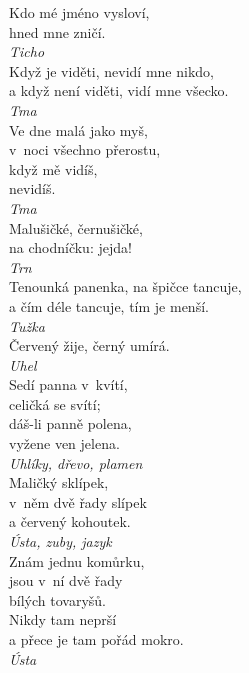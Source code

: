 \begin{multicols}{3}
\noindent
Kdo mé jméno vysloví,\\
hned mne zničí.\\[1 mm]
{\sl Ticho}\\

\noindent
Když je viděti, nevidí mne nikdo,\\
a když není viděti, vidí mne všecko.\\[1 mm]
{\sl Tma}\\

\noindent
Ve dne malá jako myš,\\
v~noci všechno přerostu,\\
když mě vidíš,\\
nevidíš.\\[1 mm]
{\sl Tma}\\

\noindent
Malušičké, černušičké,\\
na chodníčku: jejda!\\[1 mm]
{\sl Trn}\\

\noindent
Tenounká panenka, na špičce tancuje,\\
a čím déle tancuje, tím je menší.\\[1 mm]
{\sl Tužka}\\

\noindent
Červený žije, černý umírá.\\[1 mm]
{\sl Uhel}\\

\noindent
Sedí panna v~kvítí,\\
celičká se svítí;\\
dáš-li panně polena,\\
vyžene ven jelena.\\[1 mm]
{\sl Uhlíky, dřevo, plamen}\\

\noindent
Maličký sklípek,\\
v~něm dvě řady slípek\\
a červený kohoutek.\\[1 mm]
{\sl Ústa, zuby, jazyk}\\

\noindent
Znám jednu komůrku,\\
jsou v~ní dvě řady\\
bílých tovaryšů.\\
Nikdy tam neprší\\
a přece je tam pořád mokro.\\[1 mm]
{\sl Ústa}\\


\end{multicols}
